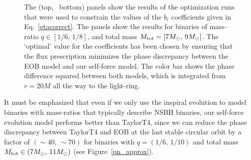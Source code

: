 \begin{figure}
{}
\caption{The (top, \, bottom) panels show the results of the optimization runs that were used to constrain the values of the \(b_i\) coefficients given in Eq.~\eqref{etacorrect}. The panels show the results for binaries of mass--ratio \(q\in [1/6,\, 1/8]\), and total mass \(M_{{\rm{tot}}}= [7M_{\odot},\,   9M_{\odot}]\). The `optimal' value for the coefficients has been chosen by ensuring that the flux prescription minimizes the phase discrepancy between the EOB model and our self-force model. The color bar shows the phase difference squared between both models, which is integrated from \(r=20M\) all the way to the light-ring.} 
\label{bimaps}
\end{figure}

It must be emphasized that even if we only use the inspiral evolution to model binaries with mass-ratios that typically describe NSBH binaries, our self-force evolution model performs better than TaylorT4, since we can reduce the phase discrepancy between TaylorT4 and EOB at the last stable circular orbit by a factor of \((\sim40, \, \sim70)\)  for binaries with \(q=(1/6,\,1/10)\)  and total mass \(M_{{\rm{tot}}}\in (7M_{\odot} ,\, 11M_{\odot} )\) (see Figure~\ref{pn_approx}).


